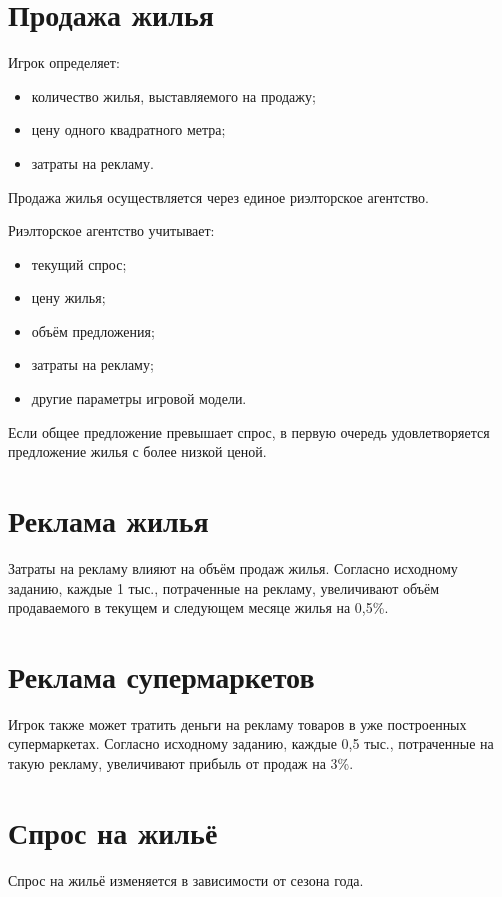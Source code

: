 \documentclass[a4paper,12pt]{article}
\begin{document}
\section{Продажа жилья}

Игрок определяет:
\begin{itemize}
    \item количество жилья, выставляемого на продажу;
    \item цену одного квадратного метра;
    \item затраты на рекламу.
\end{itemize}

Продажа жилья осуществляется через единое риэлторское агентство.

Риэлторское агентство учитывает:
\begin{itemize}
    \item текущий спрос;
    \item цену жилья;
    \item объём предложения;
    \item затраты на рекламу;
    \item другие параметры игровой модели.
\end{itemize}

Если общее предложение превышает спрос, в первую очередь удовлетворяется предложение жилья с более низкой ценой.

\section{Реклама жилья}

Затраты на рекламу влияют на объём продаж жилья.
Согласно исходному заданию, каждые 1 тыс., потраченные на рекламу, увеличивают объём продаваемого в текущем и следующем месяце жилья на 0,5\%.

\section{Реклама супермаркетов}

Игрок также может тратить деньги на рекламу товаров в уже построенных супермаркетах.
Согласно исходному заданию, каждые 0,5 тыс., потраченные на такую рекламу, увеличивают прибыль от продаж на 3\%.

\section{Спрос на жильё}

Спрос на жильё изменяется в зависимости от сезона года.
\end{document}

